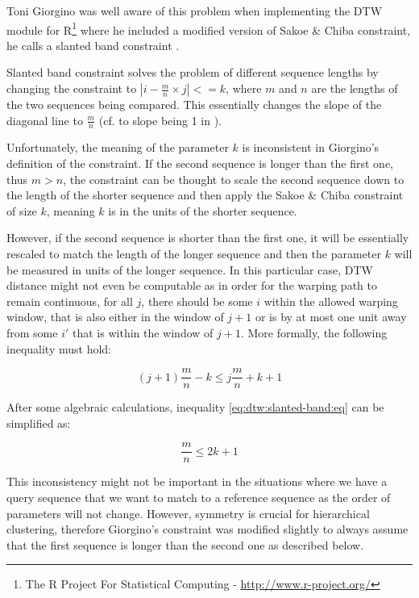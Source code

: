 \documentclass[parskip]{cs4rep}
\begin{document}
Toni Giorgino \nocite{Giorgino:2009ue} was well aware of this problem when implementing the DTW module for R\footnote{The R Project For Statistical Computing - \url{http://www.r-project.org/}} where he included a modified version of Sakoe \& Chiba constraint, he calls a slanted band constraint \citep{Giorgino:2009ue}. 

Slanted band constraint solves the problem of different sequence lengths by changing the constraint to 
$|i - \frac{m}{n} \times j| <= k$, where $m$ and $n$ are the lengths of the two sequences being compared. This essentially changes the slope of the diagonal line to $\frac{m}{n}$ (cf. to slope being 1 in \citep{Sakoe:1978ta}).

Unfortunately, the meaning of the parameter $k$ is inconsistent in Giorgino's definition of the constraint. If the second sequence is longer than the first one, thus $m > n$, the constraint can be thought to scale the second sequence down to the length of the shorter sequence and then apply the Sakoe \& Chiba constraint of size $k$, meaning $k$ is in the units of the shorter sequence. 

However, if the second sequence is shorter than the first one, it will be essentially rescaled to match the length of the longer sequence and then the parameter $k$ will be measured in units of the longer sequence. In this particular case, DTW distance might not even be computable as in order for the warping path to remain continuous, for all $j$, there should be some $i$ within the allowed warping window, that is also either in the window of $j+1$ or is by at most one unit away from some $i'$ that is within the window of $j+1$. More formally, the following inequality must hold: 

\begin{equation}\label{eq:dtw:slanted-band:eq}
(j+1) \frac{m}{n} - k \le j \frac{m}{n} + k + 1
\end{equation}

After some algebraic calculations, inequality \ref{eq:dtw:slanted-band:eq} can be simplified as:

\begin{equation}
\frac{m}{n} \le 2k + 1
\end{equation}

This inconsistency might not be important in the situations where we have a query sequence that we want to match to a reference sequence as the order of parameters will not change. However, symmetry is crucial for hierarchical clustering, therefore Giorgino's constraint was modified slightly to always assume that the first sequence is longer than the second one as described below.
\end{document}
